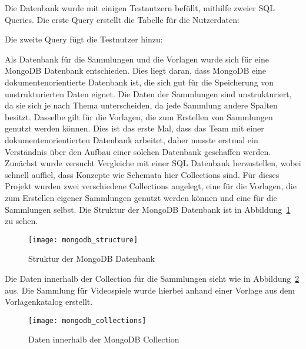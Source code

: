 Die Datenbank wurde mit einigen Testnutzern befüllt, mithilfe zweier SQL Queries.
Die erste Query erstellt die Tabelle für die Nutzerdaten:

\vspace{1em}

\vspace{1em}

Die zweite Query fügt die Testnutzer hinzu:

\vspace{1em}

\vspace{1em}

Als Datenbank für die Sammlungen und die Vorlagen wurde sich für eine MongoDB Datenbank entschieden.
Dies liegt daran, dass MongoDB eine dokumentenorientierte Datenbank ist, die sich gut für die Speicherung von unstrukturierten Daten eignet.
Die Daten der Sammlungen sind unstrukturiert, da sie sich je nach Thema unterscheiden, da jede Sammlung andere Spalten besitzt.
Dasselbe gilt für die Vorlagen, die zum Erstellen von Sammlungen genutzt werden können.
Dies ist das erste Mal, dass das Team mit einer dokumentenorientierten Datenbank arbeitet, daher musste erstmal ein Verständnis über den Aufbau einer solchen Datenbank geschaffen werden.
Zunächst wurde versucht Vergleiche mit einer SQL Datenbank herzustellen, wobei schnell auffiel, dass Konzepte wie Schemata hier Collections sind.
Für dieses Projekt wurden zwei verschiedene Collections angelegt, eine für die Vorlagen, die zum Erstellen eigener Sammlungen genutzt werden können und eine für die Sammlungen selbst.
Die Struktur der MongoDB Datenbank ist in Abbildung~\ref{fig:mongodb_structure} zu sehen.

\begin{figure}[h]
    \centering
    \texttt{[image: mongodb\_structure]}
    \caption{Struktur der MongoDB Datenbank}
    \label{fig:mongodb_structure}
\end{figure}

Die Daten innerhalb der Collection für die Sammlungen sieht wie in Abbildung~\ref{fig:mongodb_collections} aus.
Die Sammlung für Videospiele wurde hierbei anhand einer Vorlage aus dem Vorlagenkatalog erstellt.

\begin{figure}[h!]
    \centering
    \texttt{[image: mongodb\_collections]}
    \caption{Daten innerhalb der MongoDB Collection}
    \label{fig:mongodb_collections}
\end{figure}

